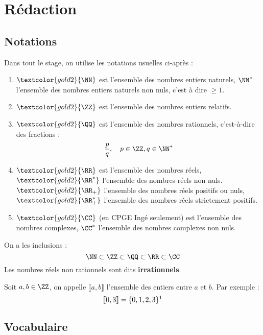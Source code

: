 


\section{Rédaction}

\subsection{Notations}


Dans tout le stage, on utilise les notations usuelles ci-après : 	
\begin{enumerate}
	\item $\textcolor{gold2}{\NN}$ est l’ensemble des nombres entiers naturels,  $\NN^*$ l’ensemble des nombres entiers naturels non nuls, c'est à dire $\geq 1$.
	
	\item $\textcolor{gold2}{\ZZ}$ est l’ensemble des nombres entiers relatifs.
	
	\item $\textcolor{gold2}{\QQ}$ est l’ensemble des nombres rationnels, c’est-à-dire des fractions :
	\[
		\frac{p}{q}, \quad p \in \ZZ, q \in \NN^*
	\]
	
	\item $\textcolor{gold2}{\RR}$ est l'ensemble des nombres réels, $\textcolor{gold2}{\RR^*}$ l'ensemble des nombres réels non nuls. $\textcolor{gold2}{\RR_+}$ l'ensemble des nombres réels positifs ou nuls, $\textcolor{gold2}{\RR_+^*}$ l'ensemble des nombres réels strictement positifs.
	
	\item $\textcolor{gold2}{\CC}$  (en CPGE Ingé seulement) est l'ensemble des nombres complexes, $\CC^*$ l'ensemble des nombres complexes non nuls.
\end{enumerate}

On a les inclusions : 
\[
	\NN \subset \ZZ \subset \QQ \subset \RR \subset \CC 
\]
Les nombres réels non rationnels sont dits \textbf{\textcolor{gold2}{irrationnels}}.

	
\Def
{
	Soit $a,b \in \ZZ$, on appelle \textcolor{gold2}{$\llbracket a, b \rrbracket$} l'ensemble des entiers entre $a$ et $b$. Par exemple :
	\[ 
		\llbracket 0, 3 \rrbracket = \{0,1,2,3\}\footnotemark
	\]
}

\subsection{Vocabulaire}


